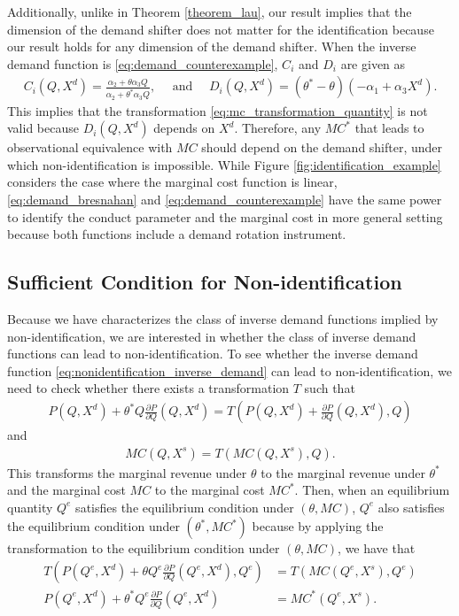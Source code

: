 \documentclass[11pt, a4paper]{article}
\theoremstyle{remark}
\begin{document}
Additionally, unlike in Theorem \ref{theorem_lau}, our result implies that the dimension of the demand shifter does not matter for the identification because our result holds for any dimension of the demand shifter.
When the inverse demand function is \eqref{eq:demand_counterexample}, $C_i$ and $D_i$ are given as
\begin{align}
    C_i(Q, X^{d}) = \frac{\alpha_2 + \theta\alpha_3Q}{\alpha_2 + \theta^{*}\alpha_3Q},\quad \text{ and }\quad  D_i(Q, X^{d}) =  (\theta^{*} - \theta)(-\alpha_1 + \alpha_3X^{d}).
\end{align}
This implies that the transformation \eqref{eq:mc_transformation_quantity} is not valid because $D_i(Q, X^{d})$ depends on $X^{d}$.
Therefore, any $MC^{*}$ that leads to observational equivalence with $MC$ should depend on the demand shifter, under which non-identification is impossible.
While Figure \ref{fig:identification_example} considers the case where the marginal cost function is linear, \eqref{eq:demand_bresnahan} and \eqref{eq:demand_counterexample} have the same power to identify the conduct parameter and the marginal cost in more general setting because both functions include a demand rotation instrument.



\subsection{Sufficient Condition for Non-identification}
Because we have characterizes the class of inverse demand functions implied by non-identification, we are interested in whether the class of inverse demand functions can lead to non-identification.
To see whether the inverse demand function \eqref{eq:nonidentification_inverse_demand} can lead to non-identification, we need to check whether there exists a transformation $T$ such that
\begin{align}
    P(Q, X^{d}) + \theta^{*} Q \frac{\partial P}{\partial Q}(Q, X^{d}) = T\left(P(Q, X^{d}) + \frac{\partial P}{\partial Q}(Q, X^{d}), Q\right)
\end{align}
and
\begin{align}
    MC(Q, X^{s}) = T\left(MC(Q, X^{s}), Q\right).
\end{align}
This transforms the marginal revenue under $\theta$ to the marginal revenue under $\theta^{*}$ and the marginal cost $MC$ to the marginal cost $MC^{*}$.
Then, when an equilibrium quantity $Q^e$ satisfies the equilibrium condition under $(\theta, MC)$, $Q^e$ also satisfies the equilibrium condition under $(\theta^{*}, MC^{*})$ because by applying the transformation to the equilibrium condition under $(\theta, MC)$, we have that
\begin{align}
    T\left(P(Q^e, X^{d}) + \theta Q^e \frac{\partial P}{\partial Q}(Q^e, X^{d}), Q^e\right)&= T\left(MC(Q^e, X^{s}), Q^e\right)\\
    P(Q^e, X^{d}) + \theta^{*} Q^e \frac{\partial P}{\partial Q}(Q^e, X^{d})&= MC^{*}(Q^e, X^{s}).
\end{align}
\end{document}
